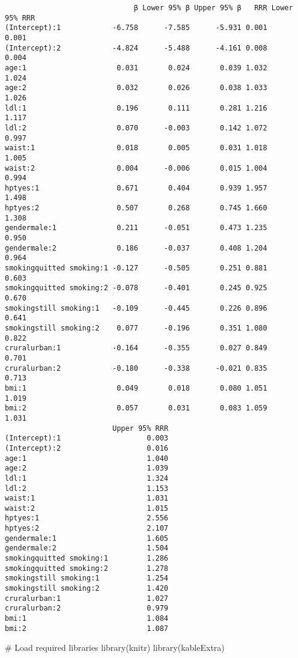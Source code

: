 \documentclass[
  letterpaper,
  DIV=11,
  numbers=noendperiod]{scrartcl}
\newenvironment{Shaded}{\begin{snugshade}}{\end{snugshade}}
\newcommand{\CommentTok}[1]{\textcolor[rgb]{0.37,0.37,0.37}{#1}}
\newcommand{\FunctionTok}[1]{\textcolor[rgb]{0.28,0.35,0.67}{#1}}
\newcommand{\NormalTok}[1]{\textcolor[rgb]{0.00,0.23,0.31}{#1}}
\begin{document}
\begin{verbatim}
                              β Lower 95% β Upper 95% β   RRR Lower 95% RRR
(Intercept):1            -6.758      -7.585      -5.931 0.001         0.001
(Intercept):2            -4.824      -5.488      -4.161 0.008         0.004
age:1                     0.031       0.024       0.039 1.032         1.024
age:2                     0.032       0.026       0.038 1.033         1.026
ldl:1                     0.196       0.111       0.281 1.216         1.117
ldl:2                     0.070      -0.003       0.142 1.072         0.997
waist:1                   0.018       0.005       0.031 1.018         1.005
waist:2                   0.004      -0.006       0.015 1.004         0.994
hptyes:1                  0.671       0.404       0.939 1.957         1.498
hptyes:2                  0.507       0.268       0.745 1.660         1.308
gendermale:1              0.211      -0.051       0.473 1.235         0.950
gendermale:2              0.186      -0.037       0.408 1.204         0.964
smokingquitted smoking:1 -0.127      -0.505       0.251 0.881         0.603
smokingquitted smoking:2 -0.078      -0.401       0.245 0.925         0.670
smokingstill smoking:1   -0.109      -0.445       0.226 0.896         0.641
smokingstill smoking:2    0.077      -0.196       0.351 1.080         0.822
cruralurban:1            -0.164      -0.355       0.027 0.849         0.701
cruralurban:2            -0.180      -0.338      -0.021 0.835         0.713
bmi:1                     0.049       0.018       0.080 1.051         1.019
bmi:2                     0.057       0.031       0.083 1.059         1.031
                         Upper 95% RRR
(Intercept):1                    0.003
(Intercept):2                    0.016
age:1                            1.040
age:2                            1.039
ldl:1                            1.324
ldl:2                            1.153
waist:1                          1.031
waist:2                          1.015
hptyes:1                         2.556
hptyes:2                         2.107
gendermale:1                     1.605
gendermale:2                     1.504
smokingquitted smoking:1         1.286
smokingquitted smoking:2         1.278
smokingstill smoking:1           1.254
smokingstill smoking:2           1.420
cruralurban:1                    1.027
cruralurban:2                    0.979
bmi:1                            1.084
bmi:2                            1.087
\end{verbatim}

\begin{Shaded}
\begin{Highlighting}[]
\CommentTok{\# Load required libraries}
\FunctionTok{library}\NormalTok{(knitr)}
\FunctionTok{library}\NormalTok{(kableExtra)}
\end{Highlighting}
\end{Shaded}
\end{document}
